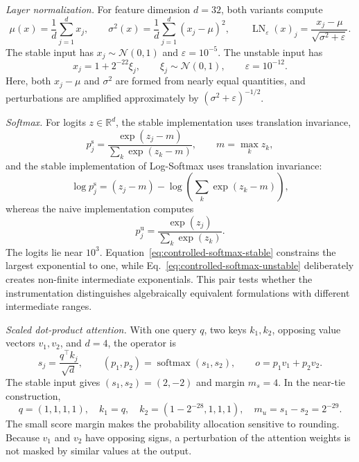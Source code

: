 \documentclass[manuscript, screen]{acmart}
\begin{document}
\emph{Layer normalization.}
For feature dimension $d=32$, both variants compute
\begin{equation}
\mu(x)=\frac{1}{d}\sum_{j=1}^{d}x_j,
\qquad
\sigma^2(x)=\frac{1}{d}\sum_{j=1}^{d}(x_j-\mu)^2,
\qquad
\operatorname{LN}_{\varepsilon}(x)_j
=
\frac{x_j-\mu}{\sqrt{\sigma^2+\varepsilon}}.
\label{eq:controlled-layernorm}
\end{equation}
The stable input has $x_j\sim\mathcal{N}(0,1)$ and $\varepsilon=10^{-5}$. The unstable input has
\begin{equation}
x_j=1+2^{-22}\xi_j,
\qquad
\xi_j\sim\mathcal{N}(0,1),
\qquad
\varepsilon=10^{-12}.
\label{eq:controlled-layernorm-nearconstant}
\end{equation}
Here, both $x_j-\mu$ and $\sigma^2$ are formed from nearly equal quantities, and perturbations are amplified approximately by $(\sigma^2+\varepsilon)^{-1/2}$.

\emph{Softmax.}
For logits $z\in\mathbb{R}^d$, the stable implementation uses translation invariance,
\begin{equation}
p_j^{\mathrm{s}}
=
\frac{\exp(z_j-m)}{\sum_k\exp(z_k-m)},
\qquad
m=\max_k z_k,
\label{eq:controlled-softmax-stable}
\end{equation}
and the stable implementation of Log-Softmax uses translation invariance:
\begin{equation}
\log p_j^{\mathrm{s}}
=
(z_j-m)
-
\log\left(\sum_k \exp(z_k-m)\right),
\label{eq:controlled-log-softmax-stable}
\end{equation}
whereas the naive implementation computes%
\begin{equation}
p_j^{\mathrm{u}}
=
\frac{\exp(z_j)}{\sum_k\exp(z_k)}.
\label{eq:controlled-softmax-unstable}
\end{equation}
The logits lie near $10^3$. Equation~\eqref{eq:controlled-softmax-stable} constrains the largest exponential to one, while Eq.~\eqref{eq:controlled-softmax-unstable} deliberately creates non-finite intermediate exponentials. This pair tests whether the instrumentation distinguishes algebraically equivalent formulations with different intermediate ranges.

\emph{Scaled dot-product attention.}
With one query $q$, two keys $k_1,k_2$, opposing value vectors $v_1,v_2$, and $d=4$, the operator is
\begin{equation}
s_j=\frac{q^\top k_j}{\sqrt{d}},
\qquad
(p_1,p_2)=\operatorname{softmax}(s_1,s_2),
\qquad
o=p_1v_1+p_2v_2.
\label{eq:controlled-attention}
\end{equation}
The stable input gives $(s_1,s_2)=(2,-2)$ and margin $m_s=4$. In the near-tie construction,
\begin{equation}
q=(1,1,1,1),
\quad
k_1=q,
\quad
k_2=(1-2^{-28},1,1,1),
\quad
m_u=s_1-s_2=2^{-29}.
\label{eq:controlled-attention-neartie}
\end{equation}
The small score margin makes the probability allocation sensitive to rounding. Because $v_1$ and $v_2$ have opposing signs, a perturbation of the attention weights is not masked by similar values at the output.
\end{document}
